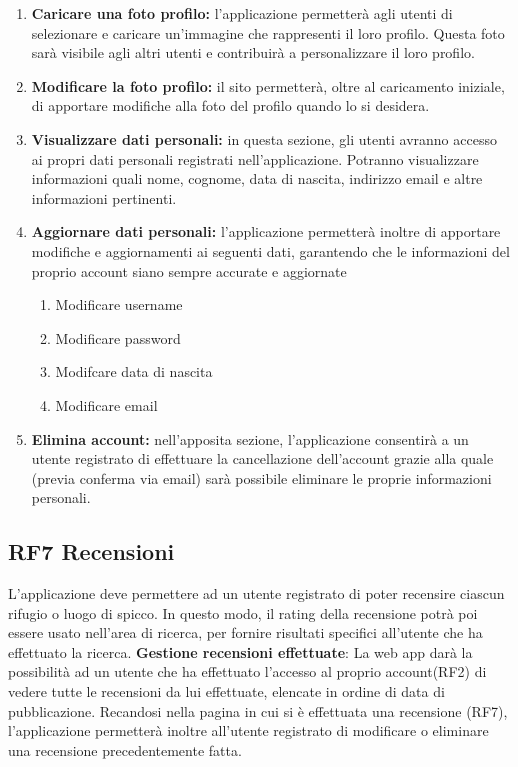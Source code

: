\documentclass[a4paper,12pt]{article}
\begin{document}
\begin{enumerate} [leftmargin=40pt]
  \item \textbf{Caricare una foto profilo:} l'applicazione permetterà agli utenti di selezionare e caricare un'immagine che rappresenti il loro profilo. Questa foto sarà visibile agli altri utenti e contribuirà a personalizzare il loro profilo.

  \item \textbf{Modificare la foto profilo:} il sito permetterà, oltre al caricamento iniziale, di apportare modifiche alla foto del profilo quando lo si desidera. 

  

  \item \textbf{Visualizzare dati personali:} in questa sezione, gli utenti avranno accesso ai propri dati personali registrati nell'applicazione. Potranno visualizzare informazioni quali nome, cognome, data di nascita, indirizzo email e altre informazioni pertinenti.

  \item \textbf{Aggiornare dati personali:} l'applicazione permetterà inoltre di apportare modifiche e aggiornamenti ai seguenti dati, garantendo che le informazioni del proprio account siano sempre accurate e aggiornate
  
  \begin{enumerate} [leftmargin=40pt]
     \item Modificare username
     \item Modificare password
     \item Modifcare data di nascita
     \item Modificare email
 \end{enumerate}

  \item \textbf{Elimina account:} nell’apposita sezione, l'applicazione consentirà a un utente registrato di effettuare la cancellazione dell'account grazie alla quale (previa conferma via email) sarà possibile eliminare le proprie informazioni personali.
\end{enumerate}


\subsection*{RF7 Recensioni}
L'applicazione deve permettere ad un utente registrato di poter recensire ciascun rifugio o luogo di spicco.\newline
In questo modo, il rating della recensione potrà poi essere usato nell'area di ricerca, per fornire risultati specifici all'utente che ha effettuato la ricerca. \newline\newline
\textbf{Gestione recensioni effettuate}: La web app darà la possibilità ad un utente che ha effettuato l'accesso al proprio account(RF2) di vedere tutte le recensioni da lui effettuate, elencate in ordine di data di pubblicazione.
Recandosi nella pagina in cui si è effettuata una recensione (RF7), l'applicazione permetterà inoltre all'utente registrato di modificare o eliminare una recensione precedentemente fatta.\newline
\end{document}
